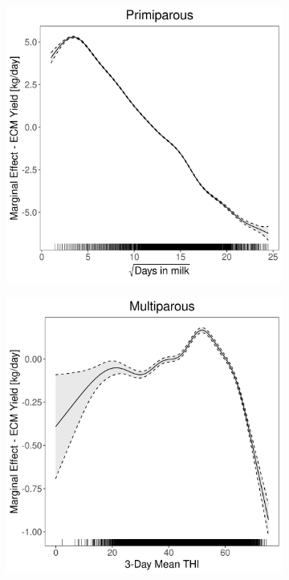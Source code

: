 \begin{figure}[H]
\begin{subfigure}[b]{0.45\textwidth}
    \end{subfigure}
    \hspace{0.05\textwidth} %
    \begin{subfigure}[b]{0.45\textwidth}
        \centering
        \includegraphics[width=\textwidth]{thesis/figures/models/ecm/before2010/bs_ecm_before2010/bs_ecm_before2010_marginal_dim_milk_primi.png}
    \end{subfigure}
    \begin{subfigure}[b]{0.45\textwidth}
        \centering
        \includegraphics[width=\textwidth]{thesis/figures/models/ecm/before2010/bs_ecm_before2010/bs_ecm_before2010_marginal_thi_milk_multi.png}

\end{subfigure}
\end{figure}

